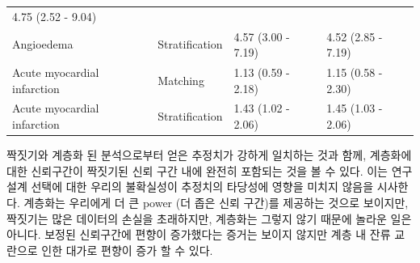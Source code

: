 \documentclass[11pt]{book}
\theoremstyle{definition}
\theoremstyle{definition}
\theoremstyle{definition}
\theoremstyle{remark}
\begin{document}
\begin{longtable}[]{@{}llll@{}}
\begin{minipage}[t]{0.17\columnwidth}
4.75 (2.52 - 9.04)\strut
\end{minipage}\tabularnewline
\begin{minipage}[t]{0.27\columnwidth}\raggedright\strut
Angioedema\strut
\end{minipage} & \begin{minipage}[t]{0.15\columnwidth}\raggedright\strut
Stratification\strut
\end{minipage} & \begin{minipage}[t]{0.17\columnwidth}\raggedright\strut
4.57 (3.00 - 7.19)\strut
\end{minipage} & \begin{minipage}[t]{0.17\columnwidth}\raggedright\strut
4.52 (2.85 - 7.19)\strut
\end{minipage}\tabularnewline
\begin{minipage}[t]{0.27\columnwidth}\raggedright\strut
Acute myocardial infarction\strut
\end{minipage} & \begin{minipage}[t]{0.15\columnwidth}\raggedright\strut
Matching\strut
\end{minipage} & \begin{minipage}[t]{0.17\columnwidth}\raggedright\strut
1.13 (0.59 - 2.18)\strut
\end{minipage} & \begin{minipage}[t]{0.17\columnwidth}\raggedright\strut
1.15 (0.58 - 2.30)\strut
\end{minipage}\tabularnewline
\begin{minipage}[t]{0.27\columnwidth}\raggedright\strut
Acute myocardial infarction\strut
\end{minipage} & \begin{minipage}[t]{0.15\columnwidth}\raggedright\strut
Stratification\strut
\end{minipage} & \begin{minipage}[t]{0.17\columnwidth}\raggedright\strut
1.43 (1.02 - 2.06)\strut
\end{minipage} & \begin{minipage}[t]{0.17\columnwidth}\raggedright\strut
1.45 (1.03 - 2.06)\strut
\end{minipage}\tabularnewline
\bottomrule
\end{longtable}

짝짓기와 계층화 된 분석으로부터 얻은 추정치가 강하게 일치하는 것과 함께,
계층화에 대한 신뢰구간이 짝짓기된 신뢰 구간 내에 완전히 포함되는 것을 볼
수 있다. 이는 연구 설계 선택에 대한 우리의 불확실성이 추정치의 타당성에
영향을 미치지 않음을 시사한다. 계층화는 우리에게 더 큰 power (더 좁은
신뢰 구간)를 제공하는 것으로 보이지만, 짝짓기는 많은 데이터의 손실을
초래하지만, 계층화는 그렇지 않기 때문에 놀라운 일은 아니다. 보정된
신뢰구간에 편향이 증가했다는 증거는 보이지 않지만 계층 내 잔류 교란으로
인한 대가로 편향이 증가 할 수 있다.
\end{document}

